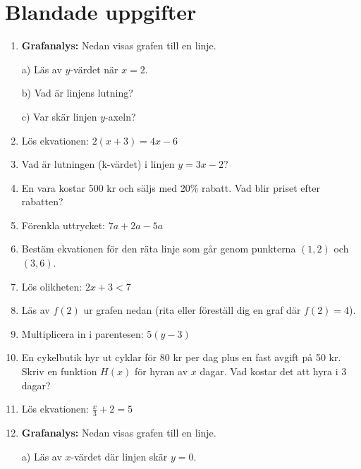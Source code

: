 \documentclass[a4paper,11pt]{article}
\begin{document}
\section*{Blandade uppgifter}
\begin{enumerate}[label=\textbf{B\arabic*.}]
    \item \textbf{Grafanalys:} Nedan visas grafen till en linje.
    \begin{center}
    \end{center}
    a) Läs av $y$-värdet när $x=2$.
    
    b) Vad är linjens lutning?
    
    c) Var skär linjen $y$-axeln?

    \item Lös ekvationen: $2(x+3) = 4x - 6$
    \item Vad är lutningen (k-värdet) i linjen $y = 3x - 2$?
    \item En vara kostar 500 kr och säljs med 20\% rabatt. Vad blir priset efter rabatten?
    \item Förenkla uttrycket: $7a + 2a - 5a$
    \item Bestäm ekvationen för den räta linje som går genom punkterna $(1,2)$ och $(3,6)$.
    \item Lös olikheten: $2x + 3 < 7$
    \item Läs av $f(2)$ ur grafen nedan (rita eller föreställ dig en graf där $f(2) = 4$).
    \item Multiplicera in i parentesen: $5(y - 3)$
    \item En cykelbutik hyr ut cyklar för 80 kr per dag plus en fast avgift på 50 kr. Skriv en funktion $H(x)$ för hyran av $x$ dagar. Vad kostar det att hyra i 3 dagar?
    \item Lös ekvationen: $\frac{x}{3} + 2 = 5$
    \newpage
    \item \textbf{Grafanalys:} Nedan visas grafen till en linje.
    \begin{center}
    \end{center}
    a) Läs av $x$-värdet där linjen skär $y=0$.
    

\end{enumerate}
\end{document}
